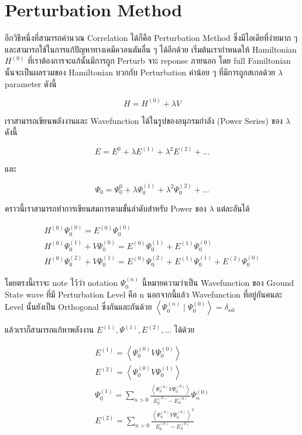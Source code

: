 \section{Perturbation Method}

อีกวิธีหนึ่งที่สามารถคำนวณ Correlation ได้ก็คือ Perturbation Method ซึ่งมีไอเดียที่ง่ายมาก ๆ
และสามารถใช้ในการแก้ปัญหาทางเคมีควอนตัมอื่น ๆ ได้อีกด้วย เริ่มต้นเรากำหนดให้ Hamiltonian
$H^{(0)}$ ที่เราต้องการจะแก้นั้นมีการถูก Perturb จาะ reponse ภายนอก โดย full
Familtonian นั้นจะเป็นผลรวมของ Hamiltonian บวกกับ Perturbation ค่าน้อย ๆ
ที่มีการถูกสเกลด้วย $\lambda$ parameter ดังนี้

\begin{equation}
    H = H^{(0)} + \lambda V
\end{equation}

เราสามารถเขียนพลังงานและ Wavefunction ได้ในรูปของอนุกรมกำลัง (Power Series)
ของ $\lambda$ ดังนี้

\begin{equation}
    E = E^{0} + \lambda E^{(1)} + \lambda^{2} E^{(2)} + \dots
\end{equation}

\noindent และ

\begin{equation}
    \Psi_{0} = \Psi_{0}^{0} + \lambda \Psi_{0}^{(1)}
    + \lambda^{2} \Psi_{0}^{(2)} + \dots
\end{equation}

คราวนี้เราสามารถทำการเขียนสมการตามขั้นลำดับสำหรับ Power ของ $\lambda$ แต่ละอันได้

\begin{gather}
    H^{(0)} \Psi_0^{(0)} = E^{(0)} \Psi_0^{(0)} \\
    H^{(0)} \Psi_0^{(1)}+V \Psi_0^{(0)}
    = E^{(0)} \Psi_0^{(1)}+E^{(1)} \Psi_0^{(0)} \\
    H^{(0)} \Psi_0^{(2)}+V \Psi_0^{(1)}
    = E^{(0)} \Psi_0^{(2)}+E^{(1)} \Psi_0^{(1)}+E^{(2)} \Psi_0^{(0)}
\end{gather}

โดยตรงนี้เราจะ note ไว้ว่า notation $\Psi_0^{(n)}$ นี้หมายความว่าเป็น Wavefunction
ของ Ground State wave ที่มี Perturbation Level คือ $\mathrm{n}$
นอกจากนี้แล้ว Wavefunction ที่อยู่กันคนละ Level นั้นยังเป็น Orthogonal ซึ่งกันและกันด้วย
$\left\langle\Psi_0^{(n)} \mid \Psi_0^{(0)}\right\rangle = \delta_{n 0}$

แล้วเราก็สามารถแก้หาพลังงาน $E^{(1)}, \Psi^{(1)}, E^{(2)}, \dots$ ได้ด้วย

\begin{gather}
    E^{(1)} = \left\langle\Psi_0^{(0)} V \Psi_0^{(0)}\right\rangle \\
    E^{(2)} = \left\langle\Psi_0^{(0)} V \Psi_0^{(1)}\right\rangle \\
    \Psi_0^{(1)} = \sum_{n>0} \frac{\left\langle\Psi_n^{(0)} V \Psi_0^{(0)}\right\rangle}
    {E_0^{(0)}-E_n^{(0)}} \Psi_n^{(0)} \\
    E^{(2)} = \sum_{n>0} \frac{\left\langle\Psi_n^{(0)} V \Psi_0^{(0)}\right\rangle^2}
    {E_0^{(0)}-E_n^{(0)}}
\end{gather}

